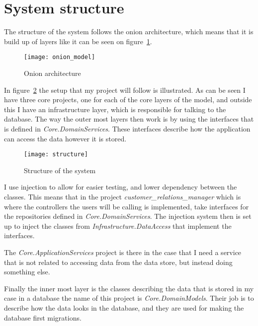 \section{System structure}
\label{sec:System structure}
The structure of the system follows the onion architecture\cite{onion_architecture}, which means that it is build up of layers like it can be seen on figure~\ref{fig:Onion architecture}.

\begin{figure}[h]
  \centering
  \texttt{[image: onion\_model]}
  \caption[Onion architecture]{Onion architecture\protect\footnotemark}
  \label{fig:Onion architecture}
\end{figure}

In figure~\ref{fig:structure} the setup that my project will follow is illustrated. As can be seen I have three core projects, one for each of the core layers of the model, and outside this I have an infrastructure layer, which is responsible for talking to the database. The way the outer most layers then work is by using the interfaces that is defined in \textit{Core.DomainServices}. These interfaces describe how the application can access the data however it is stored.

\begin{figure}[h]
  \centering
  \texttt{[image: structure]}
  \caption{Structure of the system}
  \label{fig:structure}
\end{figure}

I use injection to allow for easier testing, and lower dependency between the classes. This means that in the project \textit{customer\_relations\_manager} which is where the controllers the users will be calling is implemented, take interfaces for the repositories defined in \textit{Core.DomainServices}. The injection system then is set up to inject the classes from \textit{Infrastructure.DataAccess} that implement the interfaces.

The \textit{Core.ApplicationServices} project is there in the case that I need a service that is not related to accessing data from the data store, but instead doing something else.

Finally the inner most layer is the classes describing the data that is stored in my case in a database the name of this project is \textit{Core.DomainModels}. Their job is to describe how the data looks in the database, and they are used for making the database first migrations.


